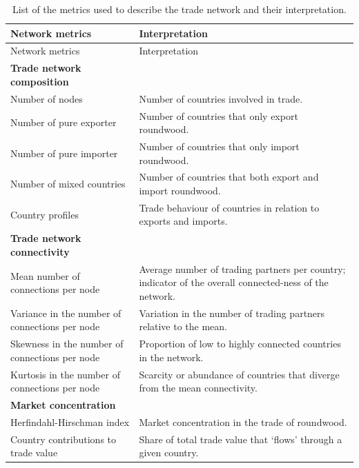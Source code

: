 \documentclass[
  authoryear,
  review,
  3p]{elsarticle}
\begin{document}
\begin{longtable}[]{@{}
  >{\raggedright\arraybackslash}p{}
  >{\raggedright\arraybackslash}p{}@{}}
\caption{List of the metrics used to describe the trade network and
their interpretation.}\label{tbl-network-metrics}\tabularnewline
\toprule\noalign{}
\begin{minipage}[b]{\linewidth}\raggedright
Network metrics
\end{minipage} & \begin{minipage}[b]{\linewidth}\raggedright
Interpretation
\end{minipage} \\
\midrule\noalign{}
\endfirsthead
\toprule\noalign{}
\begin{minipage}[b]{\linewidth}\raggedright
Network metrics
\end{minipage} & \begin{minipage}[b]{\linewidth}\raggedright
Interpretation
\end{minipage} \\
\midrule\noalign{}
\endhead
\bottomrule\noalign{}
\endlastfoot
\textbf{Trade network composition} & \\
Number of nodes & Number of countries involved in trade. \\
Number of pure exporter & Number of countries that only export
roundwood. \\
Number of pure importer & Number of countries that only import
roundwood. \\
Number of mixed countries & Number of countries that both export and
import roundwood. \\
Country profiles & Trade behaviour of countries in relation to exports
and imports. \\
\textbf{Trade network connectivity} & \\
Mean number of connections per node & Average number of trading partners
per country; indicator of the overall connected-ness of the network. \\
Variance in the number of connections per node & Variation in the number
of trading partners relative to the mean. \\
Skewness in the number of connections per node & Proportion of low to
highly connected countries in the network. \\
Kurtosis in the number of connections per node & Scarcity or abundance
of countries that diverge from the mean connectivity. \\
\textbf{Market concentration} & \\
Herfindahl-Hirschman index & Market concentration in the trade of
roundwood. \\
Country contributions to trade value & Share of total trade value that
`flows' through a given country. \\
\end{longtable}
\end{document}
